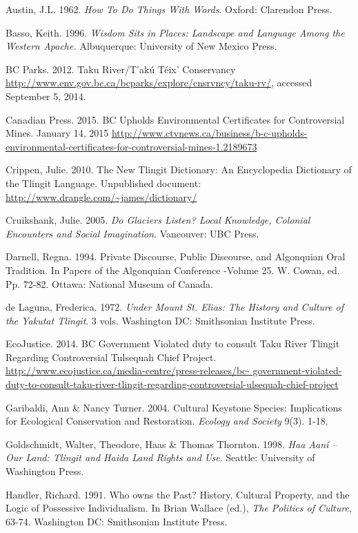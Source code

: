 \begin{hang}


Austin, J.L. 1962. \textit{How To Do Things With Words}. Oxford: Clarendon Press.

Basso, Keith. 1996. \textit{Wisdom Sits in Places: Landscape and Language Among the Western Apache.} Albuquerque: University of New Mexico Press.

BC Parks. 2012. Taku River/T’akú Téix’ Conservancy  \url{http://www.env.gov.bc.ca/bcparks/explore/cnsrvncy/taku-rv/}, accessed September 5, 2014.

Canadian Press. 2015. BC Upholds Environmental Certificates for Controversial Mines. January 14, 2015  \url{http://www.ctvnews.ca/business/b-c-upholds-environmental-certificates-for-controversial-mines-1.2189673}

Crippen, Julie. 2010. The New Tlingit Dictionary: An Encyclopedia Dictionary of the Tlingit Language. Unpublished document: \url{http://www.drangle.com/~james/dictionary/}

Cruikshank, Julie.  2005. \textit{Do Glaciers Listen? Local Knowledge, Colonial Encounters and Social Imagination}. Vancouver: UBC Press.

Darnell, Regna. 1994. Private Discourse, Public Discourse, and Algonquian Oral Tradition. In Papers of the Algonquian Conference -Volume 25. W. Cowan, ed. Pp. 72-82. Ottawa: National Museum of Canada.

de Laguna, Frederica. 1972. \textit{Under Mount St. Elias: The History and Culture of the Yakutat Tlingit}. 3 vols.  Washington DC: Smithsonian Institute Press.

EcoJustice. 2014. BC Government Violated duty to consult Taku River Tlingit Regarding Controversial  Tulsequah Chief Project. \url{http://www.ecojustice.ca/media-centre/press-releases/bc- government-violated-duty-to-consult-taku-river-tlingit-regarding-controversial-ulsequah-chief-project}

Garibaldi, Ann \& Nancy Turner. 2004. Cultural Keystone Species: Implications for Ecological Conservation and Restoration.  \textit{Ecology and Society} 9(3). 1-18.

Goldschmidt, Walter, Theodore, Haas \& Thomas Thornton. 1998.  \textit{Haa Aaní – Our Land: Tlingit and Haida Land Rights and Use}. Seattle: University of Washington Press.

Handler, Richard. 1991. Who owns the Past? History, Cultural Property, and the Logic of Possessive  Individualism. In Brian Wallace (ed.), \textit{The Politics of Culture},  63-74. Washington DC: Smithsonian Institute Press.


\end{hang}

